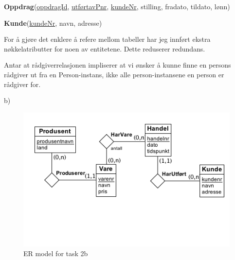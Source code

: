 \documentclass[paper=a4, fontsize=11pt]{scrartcl} %
\numberwithin{equation}{section} %
\numberwithin{figure}{section} %
\numberwithin{table}{section} %
\begin{document}
\textbf{Oppdrag}(\underline{oppdragId}, \underline{utførtavPnr}, \underline{kundeNr}, stilling, fradato, tildato, lønn)

\textbf{Kunde}(\underline{kundeNr}, navn, adresse)

\vspace{1cm}

For å gjøre det enklere å refere mellom tabeller har jeg innført ekstra nøkkelatributter for noen av entitetene. Dette reduserer redundans.

Antar at rådgiverrelasjonen impliserer at vi ønsker å kunne finne en persons rådgiver ut fra en Person-instans, ikke alle person-instansene en person er rådgiver for.

\vspace{1cm}

b)

\begin{figure}[h!]
\centering
\includegraphics[width=\textwidth]{oppg2b.png}
\caption{ER model for task 2b}
\end{figure}
\end{document}
